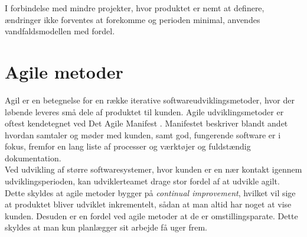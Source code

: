 I forbindelse med mindre projekter, hvor produktet er nemt at
definere, ændringer ikke forventes at forekomme og perioden minimal, 
anvendes vandfaldsmodellen med fordel.


\section{Agile metoder}\label{sec:agilemetoder}
Agil er en betegnelse for en række iterative softwareudviklingsmetoder, hvor der løbende leveres små dele af 
produktet til kunden. Agile udviklingsmetoder er oftest kendetegnet ved Det Agile Manifest \cite{AgileManifesto}.
Manifestet beskriver blandt andet hvordan samtaler og møder med kunden, samt god, fungerende software er i fokus, 
fremfor en lang liste af processer og værktøjer og fuldstændig dokumentation. \\

Ved udvikling af større softwaresystemer, hvor kunden er en nær kontakt igennem udviklingsperioden, kan udviklerteamet
drage stor fordel af at udvikle agilt. Dette skyldes at agile metoder bygger på \textit{continual improvement},
hvilket vil sige at produktet bliver udviklet inkrementelt, sådan at man altid har noget at vise kunden. Desuden er en fordel ved agile
metoder at de er omstillingsparate. Dette skyldes at man kun planlægger sit arbejde få uger frem.